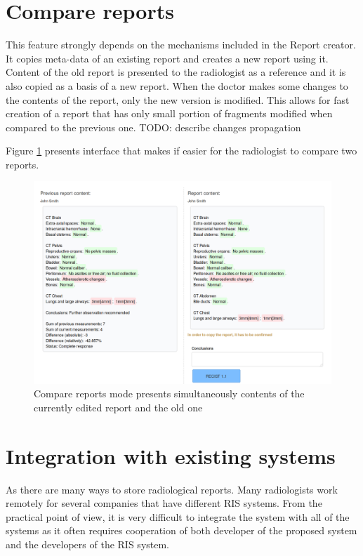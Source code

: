\documentclass[12pt, twoside, openany]{report}
\theoremstyle{definition}
\begin{document}
\section{Compare reports}
This feature strongly depends on the mechanisms included in the Report creator. It copies meta-data of an existing report and creates a new report using it. Content of the old report is presented to the radiologist as a reference and it is also copied as a basis of a new report. When the doctor makes some changes to the contents of the report, only the new version is modified. This allows for fast creation of a report that has only small portion of fragments modified when compared to the previous one.
TODO: describe changes propagation

Figure \ref{fig:compare-report} presents interface that makes if easier for the radiologist to compare two reports.



\begin{figure}
	\centering
	\includegraphics[width=\linewidth]{compare-reports}
	\caption{Compare reports mode presents simultaneously contents of the currently edited report and the old one
		\label{fig:compare-report}
	}
\end{figure}

\section{Integration with existing systems}
As there are many ways to store radiological reports. Many radiologists work remotely for several companies that have different RIS systems. From the practical point of view, it is very difficult to integrate the system with all of the systems as it often requires cooperation of both developer of the proposed system and the developers of the RIS system. 
\end{document}
